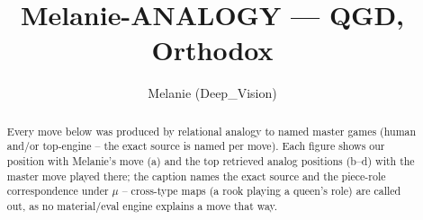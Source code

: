 \documentclass[11pt]{article}
\title{Melanie-ANALOGY — QGD, Orthodox}
\author{Melanie (Deep\_Vision)}
\date{}
\begin{document}
\maketitle

\begin{abstract}Every move below was produced by relational analogy to named master games (human and/or top-engine -- the exact source is named per move). Each figure shows our position with Melanie's move (a) and the top retrieved analog positions (b--d) with the master move played there; the caption names the exact source and the piece-role correspondence under $\mu$ -- cross-type maps (a rook playing a queen's role) are called out, as no material/eval engine explains a move that way.\end{abstract}

\begin{figure}[p]\centering
\begin{subfigure}{0.46\textwidth}\centering
\resizebox{\linewidth}{!}{%
\newchessgame
\chessboard[
  setfen={rnbq1rk1/ppp1bpp1/4pn1p/3p2B1/2PP4/2N1PN2/PP3PPP/R2QKB1R w KQ - 0 7},
  showmover=false,
  pgfstyle=straightmove, color=movearrow, markmove={g5-h4}
]}
\caption{}
\end{subfigure}\hfill
\begin{subfigure}{0.46\textwidth}\centering
\resizebox{\linewidth}{!}{%
\newchessgame
\chessboard[
  setfen={rnbq1rk1/ppp1bpp1/4pn1p/3p2B1/2PP4/2N2N2/PP2PPPP/2RQKB1R w K - 0 7},
  showmover=false,
  pgfstyle=straightmove, color=movearrow, markmove={g5-h4}
]}
\caption{}
\end{subfigure}
\\[4pt]
\begin{subfigure}{0.46\textwidth}\centering
\resizebox{\linewidth}{!}{%
\newchessgame
\chessboard[
  setfen={rnbq1rk1/ppp1bpp1/4pn1p/3p2B1/2PP4/2N2N2/PP2PPPP/2RQKB1R w K - 0 7},
  showmover=false,
  pgfstyle=straightmove, color=movearrow, markmove={g5-h4}
]}
\caption{}
\end{subfigure}\hfill
\begin{subfigure}{0.46\textwidth}\centering
\resizebox{\linewidth}{!}{%
\newchessgame
\chessboard[
  setfen={rnbq1rk1/ppp1bpp1/4pn1p/3p2B1/2PP4/2N1PN2/PP3PPP/R2QKB1R w KQ - 0 7},
  showmover=false,
  pgfstyle=straightmove, color=movearrow, markmove={g5-h4}
]}
\caption{}
\end{subfigure}

\end{figure}
\end{document}
